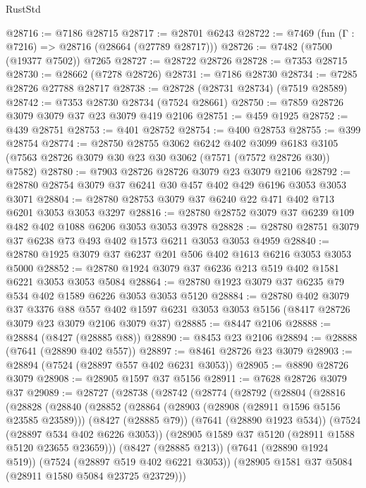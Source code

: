 \begin{lexlean}{RustStd}
\begin{coremodule}
@28716 := @7186 @28715
@28717 := @28701 @6243
@28722 := @7469 (fun (Γ : @7216) => @28716 (@28664 (@27789 @28717)))
@28726 := @7482 (@7500 (@19377 @7502)) @7265
@28727 := @28722 @28726
@28728 := @7353 @28715
@28730 := @28662 (@7278 @28726)
@28731 := @7186 @28730
@28734 := @7285 @28726 @27788 @28717
@28738 := @28728 (@28731 @28734) (@7519 @28589)
@28742 := @7353 @28730 @28734 (@7524 @28661)
@28750 := @7859 @28726 @3079 @3079 @37 @23 @3079 @419 @2106
@28751 := @459 @1925
@28752 := @439 @28751
@28753 := @401 @28752
@28754 := @400 @28753
@28755 := @399 @28754
@28774 := @28750
    @28755
    @3062
    @6242
    @402
    @3099
    @6183
    @3105
    (@7563 @28726 @3079 @30 @23 @30 @3062 (@7571 (@7572 @28726 @30)) @7582)
@28780 := @7903 @28726 @28726 @3079 @23 @3079 @2106
@28792 := @28780 @28754 @3079 @37 @6241 @30 @457 @402 @429 @6196 @3053 @3053 @3071
@28804 := @28780 @28753 @3079 @37 @6240 @22 @471 @402 @713 @6201 @3053 @3053 @3297
@28816 := @28780 @28752 @3079 @37 @6239 @109 @482 @402 @1088 @6206 @3053 @3053 @3978
@28828 := @28780 @28751 @3079 @37 @6238 @73 @493 @402 @1573 @6211 @3053 @3053 @4959
@28840 := @28780 @1925 @3079 @37 @6237 @201 @506 @402 @1613 @6216 @3053 @3053 @5000
@28852 := @28780 @1924 @3079 @37 @6236 @213 @519 @402 @1581 @6221 @3053 @3053 @5084
@28864 := @28780 @1923 @3079 @37 @6235 @79 @534 @402 @1589 @6226 @3053 @3053 @5120
@28884 := @28780
    @402
    @3079
    @37
    @3376
    @88
    @557
    @402
    @1597
    @6231
    @3053
    @3053
    @5156
    (@8417 @28726 @3079 @23 @3079 @2106 @3079 @37)
@28885 := @8447 @2106
@28888 := @28884 (@8427 (@28885 @88))
@28890 := @8453 @23 @2106
@28894 := @28888 (@7641 (@28890 @402 @557))
@28897 := @8461 @28726 @23 @3079
@28903 := @28894 (@7524 (@28897 @557 @402 @6231 @3053))
@28905 := @8890 @28726 @3079
@28908 := @28905 @1597 @37 @5156
@28911 := @7628 @28726 @3079 @37
@29089 := @28727
    (@28738
      (@28742
        (@28774
          (@28792
            (@28804
              (@28816
                (@28828
                  (@28840
                    (@28852
                      (@28864
                        (@28903 (@28908 (@28911 @1596 @5156 @23585 @23589)))
                        (@8427 (@28885 @79))
                        (@7641 (@28890 @1923 @534))
                        (@7524 (@28897 @534 @402 @6226 @3053))
                        (@28905 @1589 @37 @5120 (@28911 @1588 @5120 @23655 @23659)))
                      (@8427 (@28885 @213))
                      (@7641 (@28890 @1924 @519))
                      (@7524 (@28897 @519 @402 @6221 @3053))
                      (@28905 @1581 @37 @5084 (@28911 @1580 @5084 @23725 @23729)))

\end{coremodule}
\end{lexlean}
